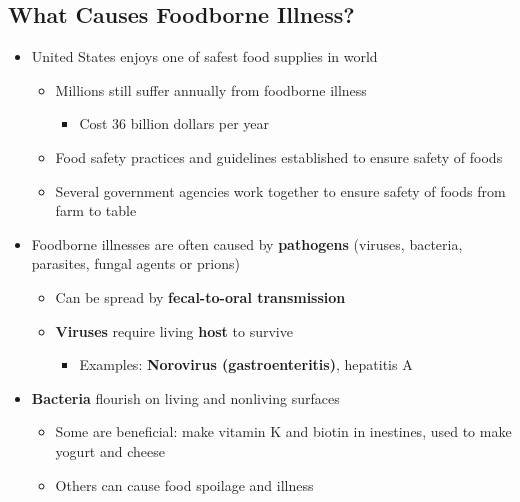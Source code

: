 \documentclass[12pt]{article}
\begin{document}
        \subsection{What Causes Foodborne Illness?}
            \begin{itemize}
                \item United States enjoys one of safest food supplies in world
                    \begin{itemize}
                        \item Millions still suffer annually from foodborne illness
                            \begin{itemize}
                                \item Cost 36 billion dollars per year
                            \end{itemize}
                        \item Food safety practices and guidelines established to ensure safety of foods
                        \item Several government agencies work together to ensure safety of foods from farm to table
                    \end{itemize}
                \item Foodborne illnesses are often caused by \textbf{pathogens} (viruses, bacteria, parasites, fungal agents or prions)
                    \begin{itemize}
                        \item Can be spread by \textbf{fecal-to-oral transmission}
                        \item \textbf{Viruses} require living \textbf{host} to survive
                            \begin{itemize}
                                \item Examples: \textbf{Norovirus (gastroenteritis)}, hepatitis A
                            \end{itemize}
                    \end{itemize}
                \item \textbf{Bacteria} flourish on living and nonliving surfaces
                    \begin{itemize}
                        \item Some are beneficial: make vitamin K and biotin in inestines, used to make yogurt and cheese
                        \item Others can cause food spoilage and illness

\end{itemize}
\end{itemize}
\end{document}
